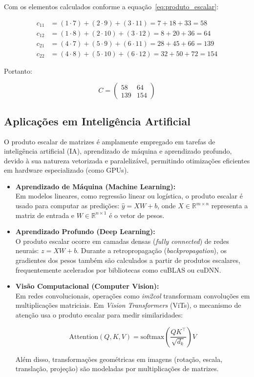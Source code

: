Com os elementos calculados conforme a equação~\eqref{eq:produto_escalar}:

\[
	\begin{aligned}
		c_{11} & = (1 \cdot 7) + (2 \cdot 9) + (3 \cdot 11) = 7 + 18 + 33 = 58    \\
		c_{12} & = (1 \cdot 8) + (2 \cdot 10) + (3 \cdot 12) = 8 + 20 + 36 = 64   \\
		c_{21} & = (4 \cdot 7) + (5 \cdot 9) + (6 \cdot 11) = 28 + 45 + 66 = 139  \\
		c_{22} & = (4 \cdot 8) + (5 \cdot 10) + (6 \cdot 12) = 32 + 50 + 72 = 154
	\end{aligned}
\]

Portanto:

\[
	C = \begin{pmatrix}
		58  & 64  \\
		139 & 154
	\end{pmatrix}
\]

\subsection{Aplicações em Inteligência Artificial}

O produto escalar de matrizes é amplamente empregado em tarefas de inteligência artificial (IA), aprendizado de máquina e aprendizado profundo, devido à sua natureza vetorizada e paralelizável, permitindo otimizações eficientes em hardware especializado (como GPUs).

\begin{itemize}
	\item \textbf{Aprendizado de Máquina (Machine Learning):} \\
	      Em modelos lineares, como regressão linear ou logística, o produto escalar é usado para computar as predições: \( \hat{y} = XW + b \), onde \( X \in \mathbb{R}^{m \times n} \) representa a matriz de entrada e \( W \in \mathbb{R}^{n \times 1} \) é o vetor de pesos.

	\item \textbf{Aprendizado Profundo (Deep Learning):} \\
	      O produto escalar ocorre em camadas densas (\textit{fully connected}) de redes neurais: \( z = XW + b \). Durante a retropropagação (\textit{backpropagation}), os gradientes dos pesos também são calculados a partir de produtos escalares, frequentemente acelerados por bibliotecas como cuBLAS ou cuDNN.

	\item \textbf{Visão Computacional (Computer Vision):} \\
	      Em redes convolucionais, operações como \textit{im2col} transformam convoluções em multiplicações matriciais. Em \textit{Vision Transformers} (ViTs), o mecanismo de atenção usa o produto escalar para medir similaridades:

	      \[
		      \text{Attention}(Q, K, V) = \text{softmax}\left(\frac{QK^\top}{\sqrt{d_k}}\right)V
	      \]

	      Além disso, transformações geométricas em imagens (rotação, escala, translação, projeção) são modeladas por multiplicações de matrizes.
\end{itemize}


